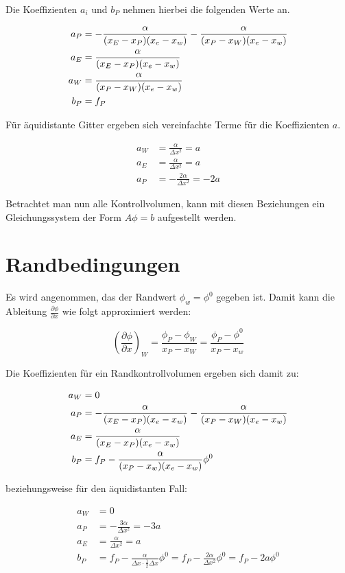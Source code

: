 \documentclass[11pt, ngerman,colorback,accentcolor=tud2d]{tudreport}
\begin{document}
Die Koeffizienten $a_i$ und $b_P$ nehmen hierbei die folgenden Werte an.

\begin{align*}
  a_P &= -\frac{\alpha}{(x_E-x_P) (x_e-x_w)} - \frac{\alpha}{(x_P-x_W) (x_e-x_w)}\\
a_E &= \frac{\alpha}{(x_E-x_P) (x_e-x_w)}\\
a_W &= \frac{\alpha}{(x_P-x_W) (x_e-x_w)}\\
b_P &= f_P
\end{align*}

Für äquidistante Gitter ergeben sich vereinfachte Terme für die Koeffizienten $a$.

\begin{align*}
  a_W &= \frac{\alpha}{\Delta x^2} = a\\
  a_E &= \frac{\alpha}{\Delta x^2} = a\\
  a_P &= - \frac{2 \alpha}{\Delta x^2} = -2a
\end{align*}

Betrachtet man nun alle Kontrollvolumen, kann mit diesen Beziehungen ein 
Gleichungssystem der Form $A\phi = b$ aufgestellt werden.

\section{Randbedingungen}
\label{sec:Randbedingungen}

Es wird angenommen, das der Randwert $\phi_w= \phi^0$ gegeben ist. Damit kann die
Ableitung $\frac{\partial \phi}{\partial x}$ wie folgt approximiert werden:

\begin{equation*}
\left(\frac{\partial \phi}{\partial x}\right)_W = \frac{\phi_P - \phi_W}{x_P - x_W} =
  \frac{\phi_P - \phi^0}{x_P - x_w}
\end{equation*}

Die Koeffizienten für ein Randkontrollvolumen ergeben sich damit zu:

\begin{align*}
  a_W &= 0\\
  a_P &= -\frac{\alpha}{(x_E-x_P) (x_e-x_w)} - \frac{\alpha}{(x_P-x_W) (x_e-x_w)}\\
  a_E &= \frac{\alpha}{(x_E-x_P) (x_e-x_w)}\\
  b_P &= f_P - \frac{\alpha}{(x_P -x_w)(x_e-x_w)}\phi^0
\end{align*}

beziehungsweise für den äquidistanten Fall:

\begin{align*}
  a_W &= 0\\
  a_P &=  -\frac{3 \alpha}{\Delta x^2} = -3a\\
  a_E &= \frac{\alpha}{\Delta x^2} = a\\
  b_P &= f_P - \frac{\alpha}{\Delta x \cdot \frac{1}{2} \Delta x}\phi^0 = f_P - 
  \frac{2\alpha}{\Delta x^2} \phi^0 = f_P - 2a \phi^0
\end{align*}
\end{document}
